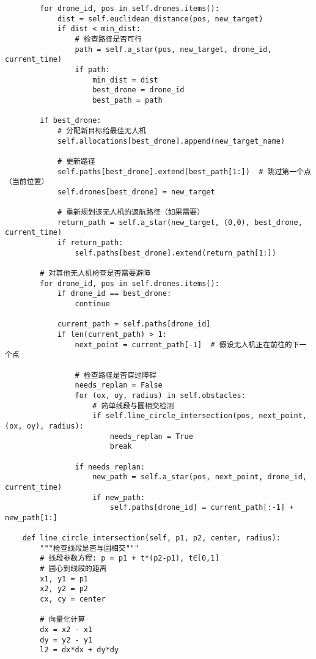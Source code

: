 \documentclass[12pt,fontset=adobe]{ctexart}
\begin{document}
\begin{verbatim}
        for drone_id, pos in self.drones.items():
            dist = self.euclidean_distance(pos, new_target)
            if dist < min_dist:
                # 检查路径是否可行
                path = self.a_star(pos, new_target, drone_id, current_time)
                if path:
                    min_dist = dist
                    best_drone = drone_id
                    best_path = path
        
        if best_drone:
            # 分配新目标给最佳无人机
            self.allocations[best_drone].append(new_target_name)
            
            # 更新路径
            self.paths[best_drone].extend(best_path[1:])  # 跳过第一个点（当前位置）
            self.drones[best_drone] = new_target
            
            # 重新规划该无人机的返航路径（如果需要）
            return_path = self.a_star(new_target, (0,0), best_drone, current_time)
            if return_path:
                self.paths[best_drone].extend(return_path[1:])
        
        # 对其他无人机检查是否需要避障
        for drone_id, pos in self.drones.items():
            if drone_id == best_drone:
                continue
                
            current_path = self.paths[drone_id]
            if len(current_path) > 1:
                next_point = current_path[-1]  # 假设无人机正在前往的下一个点
                
                # 检查路径是否穿过障碍
                needs_replan = False
                for (ox, oy, radius) in self.obstacles:
                    # 简单线段与圆相交检测
                    if self.line_circle_intersection(pos, next_point, (ox, oy), radius):
                        needs_replan = True
                        break
                
                if needs_replan:
                    new_path = self.a_star(pos, next_point, drone_id, current_time)
                    if new_path:
                        self.paths[drone_id] = current_path[:-1] + new_path[1:]
    
    def line_circle_intersection(self, p1, p2, center, radius):
        """检查线段是否与圆相交"""
        # 线段参数方程: p = p1 + t*(p2-p1), t∈[0,1]
        # 圆心到线段的距离
        x1, y1 = p1
        x2, y2 = p2
        cx, cy = center
        
        # 向量化计算
        dx = x2 - x1
        dy = y2 - y1
        l2 = dx*dx + dy*dy
        

\end{verbatim}
\end{document}
